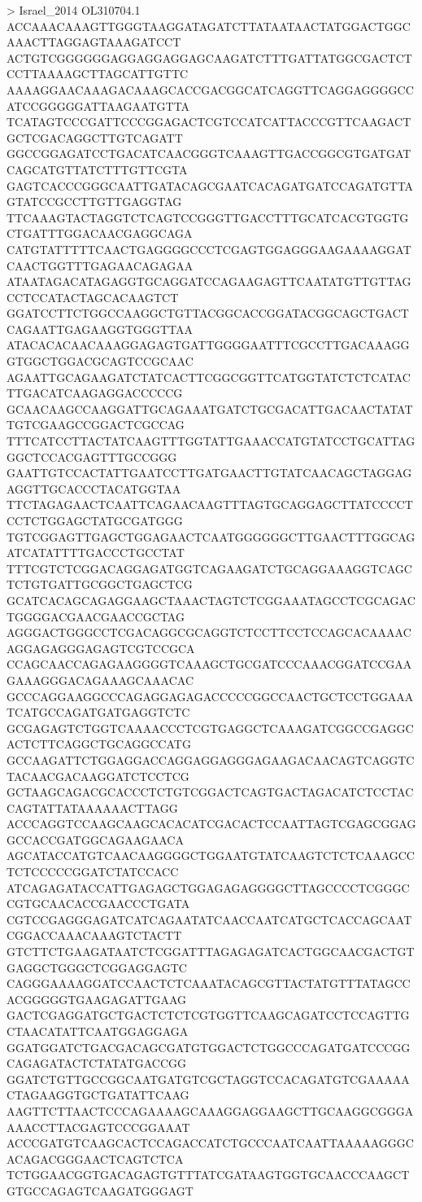> Israel_2014 OL310704.1
ACCAAACAAAGTTGGGTAAGGATAGATCTTATAATAACTATGGACTGGCAAACTTAGGAGTAAAGATCCT
ACTGTCGGGGGGAGGAGGAGGAGCAAGATCTTTGATTATGGCGACTCTCCTTAAAAGCTTAGCATTGTTC
AAAAGGAACAAAGACAAAGCACCGACGGCATCAGGTTCAGGAGGGGCCATCCGGGGGATTAAGAATGTTA
TCATAGTCCCGATTCCCGGAGACTCGTCCATCATTACCCGTTCAAGACTGCTCGACAGGCTTGTCAGATT
GGCCGGAGATCCTGACATCAACGGGTCAAAGTTGACCGGCGTGATGATCAGCATGTTATCTTTGTTCGTA
GAGTCACCCGGGCAATTGATACAGCGAATCACAGATGATCCAGATGTTAGTATCCGCCTTGTTGAGGTAG
TTCAAAGTACTAGGTCTCAGTCCGGGTTGACCTTTGCATCACGTGGTGCTGATTTGGACAACGAGGCAGA
CATGTATTTTTCAACTGAGGGGCCCTCGAGTGGAGGGAAGAAAAGGATCAACTGGTTTGAGAACAGAGAA
ATAATAGACATAGAGGTGCAGGATCCAGAAGAGTTCAATATGTTGTTAGCCTCCATACTAGCACAAGTCT
GGATCCTTCTGGCCAAGGCTGTTACGGCACCGGATACGGCAGCTGACTCAGAATTGAGAAGGTGGGTTAA
ATACACACAACAAAGGAGAGTGATTGGGGAATTTCGCCTTGACAAAGGGTGGCTGGACGCAGTCCGCAAC
AGAATTGCAGAAGATCTATCACTTCGGCGGTTCATGGTATCTCTCATACTTGACATCAAGAGGACCCCCG
GCAACAAGCCAAGGATTGCAGAAATGATCTGCGACATTGACAACTATATTGTCGAAGCCGGACTCGCCAG
TTTCATCCTTACTATCAAGTTTGGTATTGAAACCATGTATCCTGCATTAGGGCTCCACGAGTTTGCCGGG
GAATTGTCCACTATTGAATCCTTGATGAACTTGTATCAACAGCTAGGAGAGGTTGCACCCTACATGGTAA
TTCTAGAGAACTCAATTCAGAACAAGTTTAGTGCAGGAGCTTATCCCCTCCTCTGGAGCTATGCGATGGG
TGTCGGAGTTGAGCTGGAGAACTCAATGGGGGGCTTGAACTTTGGCAGATCATATTTTGACCCTGCCTAT
TTTCGTCTCGGACAGGAGATGGTCAGAAGATCTGCAGGAAAGGTCAGCTCTGTGATTGCGGCTGAGCTCG
GCATCACAGCAGAGGAAGCTAAACTAGTCTCGGAAATAGCCTCGCAGACTGGGGACGAACGAACCGCTAG
AGGGACTGGGCCTCGACAGGCGCAGGTCTCCTTCCTCCAGCACAAAACAGGAGAGGGAGAGTCGTCCGCA
CCAGCAACCAGAGAAGGGGTCAAAGCTGCGATCCCAAACGGATCCGAAGAAAGGGACAGAAAGCAAACAC
GCCCAGGAAGGCCCAGAGGAGAGACCCCCGGCCAACTGCTCCTGGAAATCATGCCAGATGATGAGGTCTC
GCGAGAGTCTGGTCAAAACCCTCGTGAGGCTCAAAGATCGGCCGAGGCACTCTTCAGGCTGCAGGCCATG
GCCAAGATTCTGGAGGACCAGGAGGAGGGAGAAGACAACAGTCAGGTCTACAACGACAAGGATCTCCTCG
GCTAAGCAGACGCACCCTCTGTCGGACTCAGTGACTAGACATCTCCTACCAGTATTATAAAAAACTTAGG
ACCCAGGTCCAAGCAAGCACACATCGACACTCCAATTAGTCGAGCGGAGGCCACCGATGGCAGAAGAACA
AGCATACCATGTCAACAAGGGGCTGGAATGTATCAAGTCTCTCAAAGCCTCTCCCCCGGATCTATCCACC
ATCAGAGATACCATTGAGAGCTGGAGAGAGGGGCTTAGCCCCTCGGGCCGTGCAACACCGAACCCTGATA
CGTCCGAGGGAGATCATCAGAATATCAACCAATCATGCTCACCAGCAATCGGACCAAACAAAGTCTACTT
GTCTTCTGAAGATAATCTCGGATTTAGAGAGATCACTGGCAACGACTGTGAGGCTGGGCTCGGAGGAGTC
CAGGGAAAAGGATCCAACTCTCAAATACAGCGTTACTATGTTTATAGCCACGGGGGTGAAGAGATTGAAG
GACTCGAGGATGCTGACTCTCTCGTGGTTCAAGCAGATCCTCCAGTTGCTAACATATTCAATGGAGGAGA
GGATGGATCTGACGACAGCGATGTGGACTCTGGCCCAGATGATCCCGGCAGAGATACTCTATATGACCGG
GGATCTGTTGCCGGCAATGATGTCGCTAGGTCCACAGATGTCGAAAAACTAGAAGGTGCTGATATTCAAG
AAGTTCTTAACTCCCAGAAAAGCAAAGGAGGAAGCTTGCAAGGCGGGAAAACCTTACGAGTCCCGGAAAT
ACCCGATGTCAAGCACTCCAGACCATCTGCCCAATCAATTAAAAAGGGCACAGACGGGAACTCAGTCTCA
TCTGGAACGGTGACAGAGTGTTTATCGATAAGTGGTGCAACCCAAGCTGTGCCAGAGTCAAGATGGGAGT
